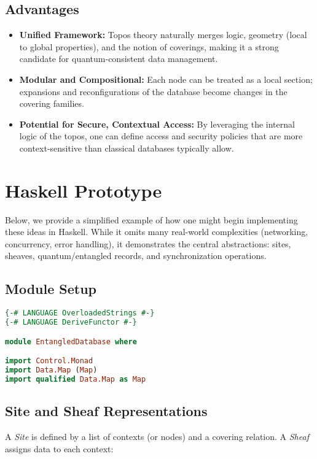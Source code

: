 \documentclass[11pt]{article}
\begin{document}
\subsection{Advantages}
\begin{itemize}
    \item \textbf{Unified Framework:} Topos theory naturally merges logic, geometry (local to global properties), and the notion of coverings, making it a strong candidate for quantum-consistent data management.
    \item \textbf{Modular and Compositional:} Each node can be treated as a local section; expansions and reconfigurations of the database become changes in the covering families.
    \item \textbf{Potential for Secure, Contextual Access:} By leveraging the internal logic of the topos, one can define access and security policies that are more context-sensitive than classical databases typically allow.
\end{itemize}

\section{Haskell Prototype}\label{sec:haskell}
Below, we provide a simplified example of how one might begin implementing these ideas in Haskell. While it omits many real-world complexities (networking, concurrency, error handling), it demonstrates the central abstractions: sites, sheaves, quantum/entangled records, and synchronization operations.

\subsection{Module Setup}
\begin{lstlisting}[language=Haskell, caption={Basic Haskell module for a topos-theoretic quantum protocol and entangled database.}]
{-# LANGUAGE OverloadedStrings #-}
{-# LANGUAGE DeriveFunctor #-}

module EntangledDatabase where

import Control.Monad
import Data.Map (Map)
import qualified Data.Map as Map
\end{lstlisting}

\subsection{Site and Sheaf Representations}
A \emph{Site} is defined by a list of contexts (or nodes) and a covering relation. A \emph{Sheaf} assigns data to each context:
\end{document}
